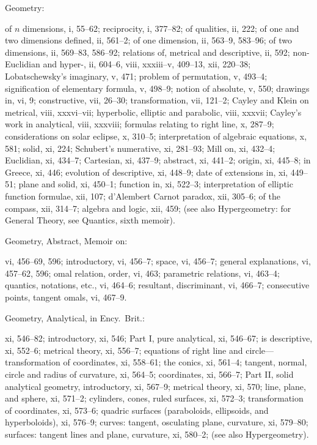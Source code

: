 \documentclass[11pt,a4paper]{book}
\providecommand{\V}[1]{#1}
\providecommand{\IndexEntry}[2]{#1\dotfill #2\par}
\begin{document}
\IndexEntry{Geometry}: of $n$ dimensions, \V{i}, 55--62; reciprocity, \V{i}, 377--82; of qualities, \V{ii}, 222; of one and two dimensions defined, \V{ii}, 561--2; of one dimension, \V{ii}, 563--9, 583--96; of two dimensions, \V{ii}, 569--83, 586--92; relations of, metrical and descriptive, \V{ii}, 592; non-Euclidian and hyper-, \V{ii}, 604--6, \V{viii}, xxxiii--v, 409--13, \V{xii}, 220--38; Lobatschewsky's imaginary, \V{v}, 471; problem of permutation, \V{v}, 493--4; signification of elementary formula, \V{v}, 498--9; notion of absolute, \V{v}, 550; drawings in, \V{vi}, 9; constructive, \V{vii}, 26--30; transformation, \V{vii}, 121--2; Cayley and Klein on metrical, \V{viii}, xxxvi--vii; hyperbolic, elliptic and parabolic, \V{viii}, xxxvii; Cayley's work in analytical, \V{viii}, xxxviii; formulas relating to right line, \V{x}, 287--9; considerations on solar eclipse, \V{x}, 310--5; interpretation of algebraic equations, \V{x}, 581; solid, \V{xi}, 224; Schubert's numerative, \V{xi}, 281--93; Mill on, \V{xi}, 432--4; Euclidian, \V{xi}, 434--7; Cartesian, \V{xi}, 437--9; abstract, \V{xi}, 441--2; origin, \V{xi}, 445--8; in Greece, \V{xi}, 446; evolution of descriptive, \V{xi}, 448--9; date of extensions in, \V{xi}, 449--51; plane and solid, \V{xi}, 450--1; function in, \V{xi}, 522--3; interpretation of elliptic function formulae, \V{xii}, 107; d'Alembert Carnot paradox, \V{xii}, 305--6; of the compass, \V{xii}, 314--7; algebra and logic, \V{xii}, 459; (see also Hypergeometry: for General Theory, see Quantics, sixth memoir).

\IndexEntry{Geometry, Abstract, Memoir on}: \V{vi}, 456--69, 596; introductory, \V{vi}, 456--7; space, \V{vi}, 456--7; general explanations, \V{vi}, 457--62, 596; omal relation, order, \V{vi}, 463; parametric relations, \V{vi}, 463--4; quantics, notations, etc., \V{vi}, 464--6; resultant, discriminant, \V{vi}, 466--7; consecutive points, tangent omals, \V{vi}, 467--9.

\IndexEntry{Geometry, Analytical, in Ency.\ Brit.}: \V{xi}, 546--82; introductory, \V{xi}, 546; Part I, pure analytical, \V{xi}, 546--67; is descriptive, \V{xi}, 552--6; metrical theory, \V{xi}, 556--7; equations of right line and circle---transformation of coordinates, \V{xi}, 558--61; the conics, \V{xi}, 561--4; tangent, normal, circle and radius of curvature, \V{xi}, 564--5; coordinates, \V{xi}, 566--7; Part II, solid analytical geometry, introductory, \V{xi}, 567--9; metrical theory, \V{xi}, 570; line, plane, and sphere, \V{xi}, 571--2; cylinders, cones, ruled surfaces, \V{xi}, 572--3; transformation of coordinates, \V{xi}, 573--6; quadric surfaces (paraboloids, ellipsoids, and hyperboloids), \V{xi}, 576--9; curves: tangent, osculating plane, curvature, \V{xi}, 579--80; surfaces: tangent lines and plane, curvature, \V{xi}, 580--2; (see also Hypergeometry).
\end{document}
